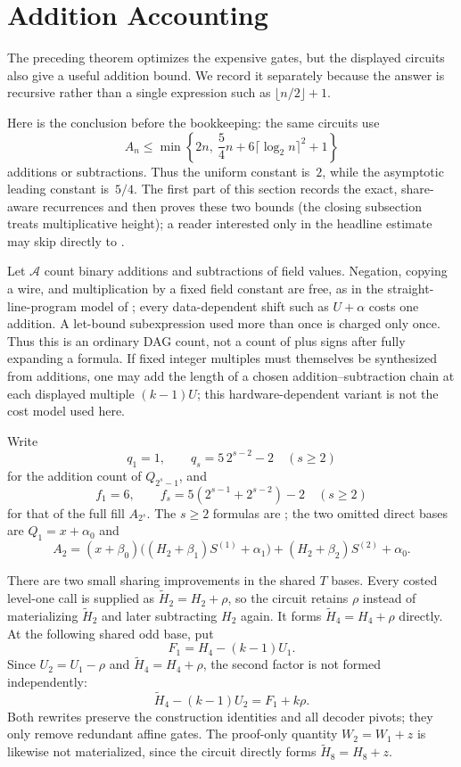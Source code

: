 \section{Addition Accounting}
\label{sec:addition-count}

The preceding theorem optimizes the expensive gates, but the displayed
circuits also give a useful addition bound.  We record it separately because
the answer is recursive rather than a single expression such as
$\lfloor n/2\rfloor+1$.

Here is the conclusion before the bookkeeping: the same circuits use
\[
  A_n\le
  \min\left\{2n,\ \frac54n+6\lceil\log_2 n\rceil^2+1\right\}
\]
additions or subtractions.  Thus the uniform constant is~$2$, while the
asymptotic leading constant is~$5/4$.  The first part of this section records
the exact, share-aware recurrences and then proves these two bounds
(the closing subsection treats multiplicative height);
a reader interested only in the headline estimate may skip directly to
.

Let $\mathcal A$ count binary additions and subtractions of field values.
Negation, copying a wire, and multiplication by a fixed field constant are
free, as in the straight-line-program model of ; every
data-dependent shift such as $U+\alpha$ costs one addition.  A let-bound
subexpression used more than once is charged only once.  Thus this is an
ordinary DAG count, not a count of plus signs after fully expanding a
formula.  If fixed integer multiples must themselves be synthesized from
additions, one may add the length of a chosen addition--subtraction chain at
each displayed multiple $(k-1)U$; this hardware-dependent variant is not the
cost model used here.

Write
\[
 q_1=1,\qquad q_s=5\,2^{s-2}-2\quad(s\ge2)
\]
for the addition count of $Q_{2^s-1}$, and
\[
 f_1=6,\qquad
 f_s=5(2^{s-1}+2^{s-2})-2\quad(s\ge2)
\]
for that of the full fill $A_{2^s}$.  The $s\ge2$ formulas are
; the two omitted direct bases are
$Q_1=x+\alpha_0$ and
\[
 A_2=(x+\beta_0)\bigl((H_2+\beta_1)S^{(1)}+\alpha_1\bigr)
       +(H_2+\beta_2)S^{(2)}+\alpha_0.
\]

There are two small sharing improvements in the shared $T$ bases.  Every
costed level-one call is supplied as
$\widetilde H_2=H_2+\rho$, so the circuit retains $\rho$ instead of
materializing $\widetilde H_2$ and later subtracting $H_2$ again.  It forms
$\widetilde H_4=H_4+\rho$ directly.  At the following shared odd base, put
\[
 F_1=H_4-(k-1)U_1.
\]
Since $U_2=U_1-\rho$ and $\widetilde H_4=H_4+\rho$, the second factor is
not formed independently:
\begin{equation}
 \widetilde H_4-(k-1)U_2=F_1+k\rho.
 \label{eq:shared-factor}
\end{equation}
Both rewrites preserve the construction identities and all decoder pivots;
they only remove redundant affine gates.  The proof-only quantity
$W_2=W_1+z$ is likewise not materialized, since the circuit directly forms
$\widetilde H_8=H_8+z$.

